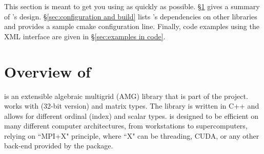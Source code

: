 This section is meant to get you using \muelu{} as quickly as possible.  \S\ref{sec:overview} gives a
summary of \muelu's design.  \S\ref{sec:configuration and build} lists \muelu's dependencies on other
\trilinos libraries and provides a sample cmake configuration line.  Finally, code examples using the XML
interface are given in \S\ref{sec:examples in code}.

\section{Overview of \muelu}
\label{sec:overview}
\muelu{} is an extensible algebraic multigrid (AMG) library that is part of the
\trilinos{} project. \muelu{} works with \epetra (32-bit version) and
\tpetra matrix types. The library is written in C++ and allows for different
ordinal (index) and scalar types.  \muelu{} is designed to be efficient on many
different computer architectures, from workstations to supercomputers, relying
on ``MPI+X" principle, where ``X" can be threading, CUDA, or any other back-end provided by the \kokkos package.

